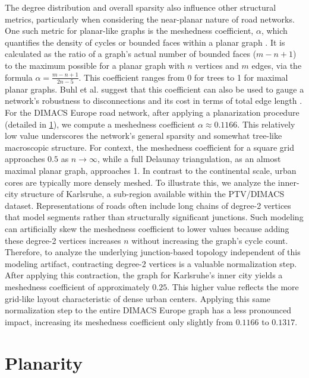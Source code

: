 The degree distribution and overall sparsity also influence other structural metrics, particularly when considering the near-planar nature of road networks.
One such metric for planar-like graphs is the meshedness coefficient, \(\alpha\), which quantifies the density of cycles or bounded faces within a planar graph \cite{buhl_topological_2006}.
It is calculated as the ratio of a graph's actual number of bounded faces (\(m - n + 1\)) to the maximum possible for a planar graph with \(n\) vertices and \(m\) edges, via the formula \(\alpha = \frac{m - n + 1}{2n - 5}\).
This coefficient ranges from 0 for trees to 1 for maximal planar graphs.
Buhl et al. suggest that this coefficient can also be used to gauge a network's robustness to disconnections and its cost in terms of total edge length \cite{buhl_topological_2006}.
For the DIMACS Europe road network, after applying a planarization procedure (detailed in \cref{sec:approach:planarity}), we compute a meshedness coefficient \(\alpha \approx 0.1166\).
This relatively low value underscores the network's general sparsity and somewhat tree-like macroscopic structure.
For context, the meshedness coefficient for a square grid approaches \(0.5\) as \(n \to \infty\), while a full Delaunay triangulation, as an almost maximal planar graph, approaches 1.
In contrast to the continental scale, urban cores are typically more densely meshed.
To illustrate this, we analyze the inner-city structure of Karlsruhe, a sub-region available within the PTV/DIMACS dataset.
Representations of roads often include long chains of degree-2 vertices that model segments rather than structurally significant junctions.
Such modeling can artificially skew the meshedness coefficient to lower values because adding these degree-2 vertices increases \(n\) without increasing the graph's cycle count.
Therefore, to analyze the underlying junction-based topology independent of this modeling artifact, contracting degree-2 vertices is a valuable normalization step.
After applying this contraction, the graph for Karlsruhe's inner city yields a meshedness coefficient of approximately \(0.25\).
This higher value reflects the more grid-like layout characteristic of dense urban centers.
Applying this same normalization step to the entire DIMACS Europe graph has a less pronounced impact, increasing its meshedness coefficient only slightly from \(0.1166\) to \(0.1317\).

\section{Planarity}
\label{sec:approach:planarity}


